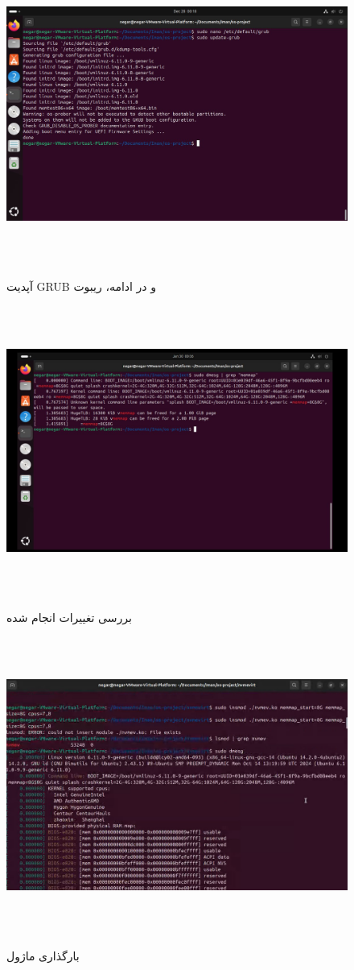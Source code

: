 ‫
‫‫\begin{figure}[H]
‫	‫	‫    \centering
‫	‫	‫    \includegraphics[width=\textwidth]{figs/12.jpg}
‫	‫	‫    \caption{آپدیت GRUB و در ادامه، ریبوت}
‫\end{figure}
‫
‫‫‫\begin{figure}[H]
‫	‫	‫	‫    \centering
‫	‫	‫	‫    \includegraphics[width=\textwidth]{figs/13.jpg}
‫			\caption{بررسی تغییرات انجام شده}
‫\end{figure}
‫
‫\begin{figure}[H]
‫	‫    \centering
‫	‫    \includegraphics[width=\textwidth]{figs/14.jpg}
‫	‫    \caption{بارگذاری ماژول}
‫\end{figure}
